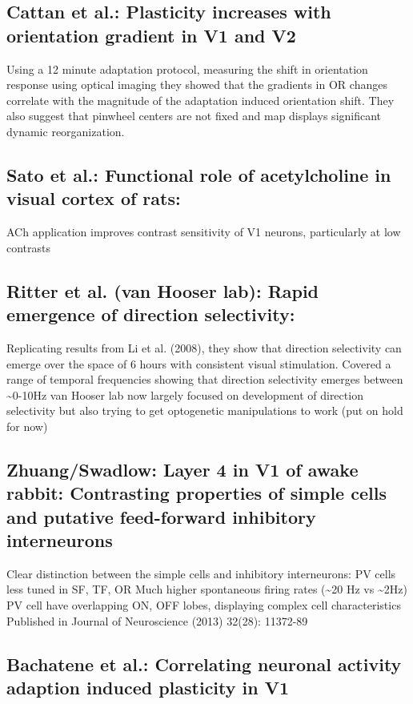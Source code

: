 \documentclass[11pt]{Science}
\begin{document}
\subsection{Cattan et al.: Plasticity increases with orientation gradient in V1 and V2}
\label{sec-1.4}


Using a 12 minute adaptation protocol, measuring the shift in orientation response using optical imaging they showed that the gradients in OR changes correlate with the magnitude of the adaptation induced orientation shift. They also suggest that pinwheel centers are not fixed and map displays significant dynamic reorganization.

\subsection{Sato et al.: Functional role of acetylcholine in visual cortex of rats:}
\label{sec-1.5}


ACh application improves contrast sensitivity of V1 neurons, particularly at low contrasts

\subsection{Ritter et al. (van Hooser lab): Rapid emergence of direction selectivity:}
\label{sec-1.6}


Replicating results from Li et al. (2008),  they show that direction selectivity can emerge over the space of 6 hours with consistent visual stimulation.
Covered a range of temporal frequencies showing that direction selectivity emerges between \~{}0-10Hz
van Hooser lab now largely focused on development of direction selectivity but also trying to get optogenetic manipulations to work (put on hold for now)

\subsection{Zhuang/Swadlow: Layer 4 in V1 of awake rabbit: Contrasting properties of simple cells and putative feed-forward inhibitory interneurons}
\label{sec-1.7}


Clear distinction between the simple cells and inhibitory interneurons:
PV cells less tuned in SF, TF, OR
Much higher spontaneous firing rates (\~{}20 Hz vs \~{}2Hz)
PV cell have overlapping ON, OFF lobes, displaying complex cell characteristics
Published in Journal of Neuroscience (2013) 32(28): 11372-89

\subsection{Bachatene et al.: Correlating neuronal activity adaption induced plasticity in V1}
\label{sec-1.8}
\end{document}
